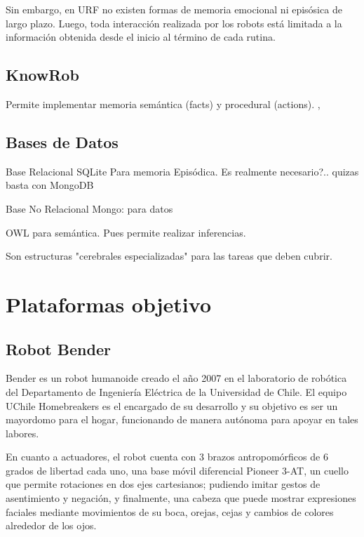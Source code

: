 Sin embargo, en URF no existen formas de memoria emocional ni epis\'osica de largo plazo. Luego, toda interacci\'on realizada por los robots est\'a limitada a la informaci\'on obtenida desde el inicio al t\'ermino de cada rutina.



\subsection{KnowRob}

Permite implementar memoria sem\'antica (facts) y procedural (actions).
\cite{Tenorth2013}, \cite{Tenorth2009}

%
%

\subsection{Bases de Datos}

Base Relacional SQLite Para memoria Epis\'odica. Es realmente necesario?.. quizas basta con MongoDB

Base No Relacional Mongo: para datos

OWL para sem\'antica. Pues permite realizar inferencias.


Son estructuras "cerebrales especializadas" para las tareas que deben cubrir.




\section{Plataformas objetivo}

\subsection{Robot Bender}

Bender es un robot humanoide creado el a\~no 2007 en el laboratorio de rob\'otica del Departamento de Ingenier\'ia El\'ectrica de la Universidad de Chile. El equipo UChile Homebreakers es el encargado de su desarrollo y  su objetivo es ser un mayordomo para el hogar, funcionando de manera aut\'onoma para apoyar en tales labores\cite{uchile-robotics}.


En cuanto a actuadores, el robot cuenta con 3 brazos antropom\'orficos de 6 grados de libertad cada uno, una base m\'ovil diferencial Pioneer 3-AT, un cuello que permite rotaciones en dos ejes cartesianos; pudiendo imitar gestos de asentimiento y negaci\'on, y finalmente, una cabeza que puede mostrar expresiones faciales mediante movimientos de su boca, orejas, cejas y cambios de colores alrededor de los ojos.

